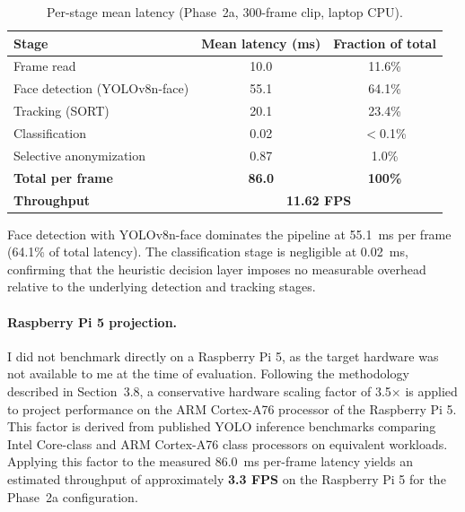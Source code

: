 \begin{table}[htbp]
\begin{singlespace}
\centering
\caption{Per-stage mean latency (Phase~2a, 300-frame clip, laptop CPU).}
\label{tab:fps}
\renewcommand{\arraystretch}{1.3}
\begin{tabular}{@{}lcc@{}}
\toprule
\textbf{Stage} & \textbf{Mean latency (ms)} & \textbf{Fraction of total} \\
\midrule
Frame read          & 10.0  & 11.6\% \\
Face detection (YOLOv8n-face) & 55.1 & 64.1\% \\
Tracking (SORT)     & 20.1  & 23.4\% \\
Classification      & 0.02  & $<$0.1\% \\
Selective anonymization & 0.87  & 1.0\% \\
\midrule
\textbf{Total per frame} & \textbf{86.0} & \textbf{100\%} \\
\textbf{Throughput}      & \multicolumn{2}{c}{\textbf{11.62 FPS}} \\
\bottomrule
\end{tabular}
\end{singlespace}
\end{table}

Face detection with YOLOv8n-face dominates the pipeline at 55.1~ms per frame
(64.1\% of total latency). The classification stage is negligible at 0.02~ms,
confirming that the heuristic decision layer imposes no measurable overhead relative
to the underlying detection and tracking stages.

\paragraph{Raspberry Pi 5 projection.}
I did not benchmark directly on a Raspberry Pi 5, as the target hardware was not
available to me at the time of evaluation. Following the methodology described in
Section~3.8, a conservative hardware scaling factor of 3.5$\times$ is applied to
project performance on the ARM Cortex-A76 processor of the Raspberry Pi 5. This
factor is derived from published YOLO inference benchmarks comparing Intel Core-class
and ARM Cortex-A76 class processors on equivalent workloads. Applying this factor to
the measured 86.0~ms per-frame latency yields an estimated throughput of
approximately \textbf{3.3 FPS} on the Raspberry Pi 5 for the Phase~2a configuration.

